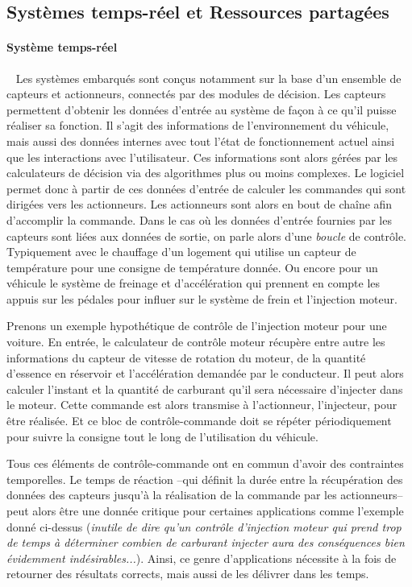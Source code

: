 \documentclass[french, a4paper, 11pt, twoside, pdftex]{StyleThese}
\begin{document}
\subsection{Systèmes temps-réel et Ressources partagées}
	\paragraph{Système temps-réel}~\label{sec:SystemesTempsReels}
	Les systèmes embarqués sont conçus notamment sur la base d'un ensemble de capteurs et actionneurs, connectés par des modules de décision. Les capteurs permettent d'obtenir les données d'entrée au système de façon à ce qu'il puisse réaliser sa fonction. Il s'agit des informations de l'environnement du véhicule, mais aussi des données internes avec tout l'état de fonctionnement actuel ainsi que les interactions avec l'utilisateur. Ces informations sont alors gérées par les calculateurs de décision via des algorithmes plus ou moins complexes. Le logiciel permet donc à partir de ces données d'entrée de calculer les commandes qui sont dirigées vers les actionneurs. Les actionneurs sont alors en bout de chaîne afin d'accomplir la commande. Dans le cas où les données d'entrée fournies par les capteurs sont liées aux données de sortie, on parle alors d'une \emph{boucle} de contrôle. Typiquement avec le chauffage d'un logement qui utilise un capteur de température pour une consigne de température donnée. Ou encore pour un véhicule le système de freinage et d'accélération qui prennent en compte les appuis sur les pédales pour influer sur le système de frein et l'injection moteur.
		
	Prenons un exemple hypothétique de contrôle de l'injection moteur pour une voiture. En entrée, le calculateur de contrôle moteur récupère entre autre les informations du capteur de vitesse de rotation du moteur, de la quantité d'essence en réservoir et l'accélération demandée par le conducteur. Il peut alors calculer l'instant et la quantité de carburant qu'il sera nécessaire d'injecter dans le moteur. Cette commande est alors transmise à l'actionneur, l'injecteur, pour être réalisée. Et ce bloc de contrôle-commande doit se répéter périodiquement pour suivre la consigne tout le long de l'utilisation du véhicule.
		
	Tous ces éléments de contrôle-commande ont en commun d'avoir des contraintes temporelles. Le temps de réaction --qui définit la durée entre la récupération des données des capteurs jusqu'à la réalisation de la commande par les actionneurs--  peut alors être une donnée critique pour certaines applications comme l'exemple donné ci-dessus (\textit{inutile de dire qu'un contrôle d'injection moteur qui prend trop de temps à déterminer combien de carburant injecter aura des conséquences bien évidemment indésirables...}). Ainsi, ce genre d'applications nécessite à la fois de retourner des résultats corrects, mais aussi de les délivrer dans les temps. 
		
\end{document}
